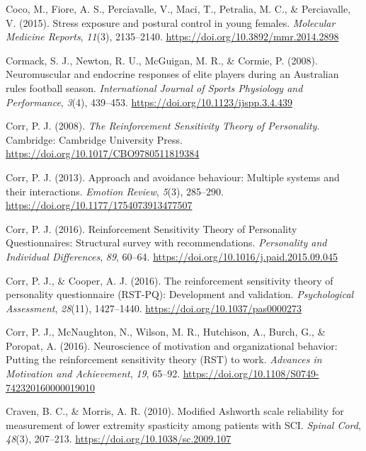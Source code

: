 \documentclass[man,floatsintext]{apa6}
\begin{document}
\leavevmode\hypertarget{ref-Coco2015}{}%
Coco, M., Fiore, A. S., Perciavalle, V., Maci, T., Petralia, M. C., \& Perciavalle, V. (2015). Stress exposure and postural control in young females. \emph{Molecular Medicine Reports}, \emph{11}(3), 2135--2140. \url{https://doi.org/10.3892/mmr.2014.2898}

\leavevmode\hypertarget{ref-Cormack2008}{}%
Cormack, S. J., Newton, R. U., McGuigan, M. R., \& Cormie, P. (2008). Neuromuscular and endocrine responses of elite players during an Australian rules football season. \emph{International Journal of Sports Physiology and Performance}, \emph{3}(4), 439--453. \url{https://doi.org/10.1123/ijspp.3.4.439}

\leavevmode\hypertarget{ref-Corr2008}{}%
Corr, P. J. (2008). \emph{The Reinforcement Sensitivity Theory of Personality}. Cambridge: Cambridge University Press. \url{https://doi.org/10.1017/CBO9780511819384}

\leavevmode\hypertarget{ref-Corr2013}{}%
Corr, P. J. (2013). Approach and avoidance behaviour: Multiple systems and their interactions. \emph{Emotion Review}, \emph{5}(3), 285--290. \url{https://doi.org/10.1177/1754073913477507}

\leavevmode\hypertarget{ref-Corr2016a}{}%
Corr, P. J. (2016). Reinforcement Sensitivity Theory of Personality Questionnaires: Structural survey with recommendations. \emph{Personality and Individual Differences}, \emph{89}, 60--64. \url{https://doi.org/10.1016/j.paid.2015.09.045}

\leavevmode\hypertarget{ref-Corr2016c}{}%
Corr, P. J., \& Cooper, A. J. (2016). The reinforcement sensitivity theory of personality questionnaire (RST-PQ): Development and validation. \emph{Psychological Assessment}, \emph{28}(11), 1427--1440. \url{https://doi.org/10.1037/pas0000273}

\leavevmode\hypertarget{ref-Corr2016b}{}%
Corr, P. J., McNaughton, N., Wilson, M. R., Hutchison, A., Burch, G., \& Poropat, A. (2016). Neuroscience of motivation and organizational behavior: Putting the reinforcement sensitivity theory (RST) to work. \emph{Advances in Motivation and Achievement}, \emph{19}, 65--92. \url{https://doi.org/10.1108/S0749-742320160000019010}

\leavevmode\hypertarget{ref-Craven2010}{}%
Craven, B. C., \& Morris, A. R. (2010). Modified Ashworth scale reliability for measurement of lower extremity spasticity among patients with SCI. \emph{Spinal Cord}, \emph{48}(3), 207--213. \url{https://doi.org/10.1038/sc.2009.107}
\end{document}
